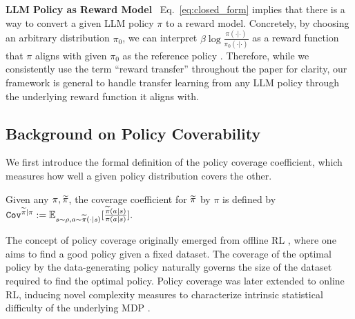 \textbf{LLM Policy as Reward Model}~
Eq.~\eqref{eq:closed_form} implies that there is a way to convert a given LLM policy $\pi$ to a reward model. Concretely, by choosing an arbitrary distribution $\pi_0$, we can interpret $\beta\log\frac{\pi(\cdot|\cdot)}{\pi_0(\cdot|\cdot)}$ as a reward function that $\pi$ aligns with given $\pi_0$ as the reference policy \citep{rosset2024direct}.
Therefore, while we consistently use the term ``reward transfer'' throughout the paper for clarity, our framework is general to handle transfer learning from any LLM policy through the underlying reward function it aligns with.


%
%
%
%
%


\subsection{Background on Policy Coverability}\label{sec:background_policy_coverage}
We first introduce the formal definition of the policy coverage coefficient, which measures how well a given policy distribution covers the other.
\begin{definition}\label{def:cov_between_policies}
    Given any $\pi,\widetilde{\pi}$, the coverage coefficient for $\widetilde{\pi}$ by $\pi$ is defined by
    $
        {\texttt{Cov}}^{\widetilde{\pi}|\pi} := \mathbb{E}_{s\sim\rho,a\sim\widetilde{\pi}(\cdot|s)}[\frac{\widetilde{\pi}(a|s)}{\pi(a|s)}].
    $
\end{definition}
The concept of policy coverage originally emerged from offline RL \citep{chen2019information, yang2020off, zhan2022offline}, where one aims to find a good policy given a fixed dataset. The coverage of the optimal policy by the data-generating policy naturally governs the size of the dataset required to find the optimal policy.
Policy coverage was later extended to online RL, inducing novel complexity measures to characterize intrinsic statistical difficulty of the underlying MDP \citep{xie2022role, amortila2024scalable}.
%
%
%
%


